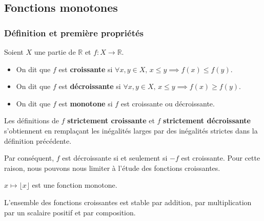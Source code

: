 




	\subsection{Fonctions monotones}

	\subsubsection{Définition et première propriétés}


	\begin{definition}
		Soient $X$ une partie de $\mathbb{R}$ et $f : X \rightarrow \mathbb{R}$.
		\begin{itemize}
			\item On dit que $f$ est \textbf{croissante} si $\forall x, y \in X, \, x \leq y \implies f(x) \leq f(y)$.
			\item On dit que $f$ est \textbf{décroissante} si $\forall x, y \in X, \, x \leq y \implies f(x) \geq f(y)$.
			\item On dit que $f$ est \textbf{monotone} si $f$ est croissante ou décroissante.
		\end{itemize}
	\end{definition}

	\begin{remark}
		Les définitions de $f$ \textbf{strictement croissante} et $f$ \textbf{strictement décroissante} s'obtiennent en remplaçant les inégalités larges par des inégalités strictes dans la définition précédente.
	\end{remark}

	Par conséquent, $f$ est décroissante si et seulement si $-f$ est croissante. Pour cette raison, nous pouvons nous limiter à l'étude des fonctions croissantes.

	\begin{example}
		$x \mapsto \lfloor x \rfloor$ est une fonction monotone.
	\end{example}


	\begin{proposition}
		L'ensemble des fonctions croissantes est stable par addition, par multiplication par un scalaire positif et par composition.
	\end{proposition}


